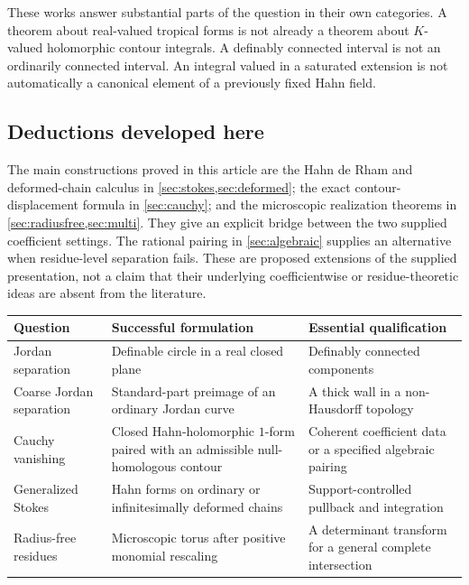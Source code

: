 \documentclass[11pt,letterpaper]{article}
\theoremstyle{definition}
\theoremstyle{remark}
\numberwithin{equation}{section}
\begin{document}
These works answer substantial parts of the question in their own categories. A theorem about real-valued tropical forms is not already a theorem about $K$-valued holomorphic contour integrals. A definably connected interval is not an ordinarily connected interval. An integral valued in a saturated extension is not automatically a canonical element of a previously fixed Hahn field.

\subsection{Deductions developed here}
The main constructions proved in this article are the Hahn de Rham and deformed-chain calculus in \cref{sec:stokes,sec:deformed}; the exact contour-displacement formula in \cref{sec:cauchy}; and the microscopic realization theorems in \cref{sec:radiusfree,sec:multi}. They give an explicit bridge between the two supplied coefficient settings. The rational pairing in \cref{sec:algebraic} supplies an alternative when residue-level separation fails. These are proposed extensions of the supplied presentation, not a claim that their underlying coefficientwise or residue-theoretic ideas are absent from the literature.

\begin{center}\small
\begin{tabular}{@{}L{0.22\textwidth}L{0.35\textwidth}L{0.33\textwidth}@{}}
\toprule
Question & Successful formulation & Essential qualification\\
\midrule
Jordan separation & Definable circle in a real closed plane & Definably connected components\\[0.35em]
Coarse Jordan separation & Standard-part preimage of an ordinary Jordan curve & A thick wall in a non-Hausdorff topology\\[0.35em]
Cauchy vanishing & Closed Hahn-holomorphic $1$-form paired with an admissible null-homologous contour & Coherent coefficient data or a specified algebraic pairing\\[0.35em]
Generalized Stokes & Hahn forms on ordinary or infinitesimally deformed chains & Support-controlled pullback and integration\\[0.35em]
Radius-free residues & Microscopic torus after positive monomial rescaling & A determinant transform for a general complete intersection\\
\bottomrule
\end{tabular}
\end{center}
\end{document}
